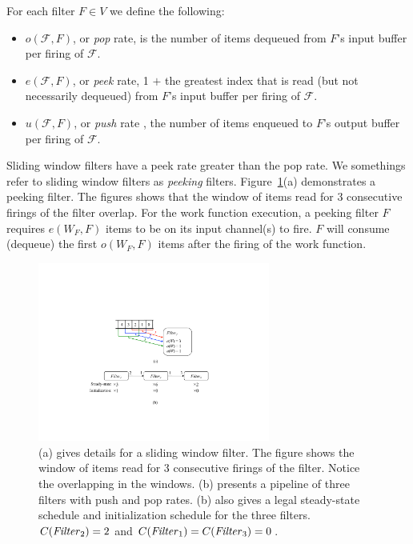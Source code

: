 For each filter $F \in V$ we define the following:
\begin{itemize}

\item $o(\mathcal{F}, F)$, or {\it pop} rate, is the number of items
  dequeued from $F$'s input buffer per firing of $\mathcal{F}$.

\item $e(\mathcal{F}, F)$, or  {\it peek} rate, 1 $+$ the greatest index that is read (but
  not necessarily dequeued) from $F$'s input buffer per firing of
  $\mathcal{F}$. 

\item $u(\mathcal{F}, F)$, or {\it push} rate , the number of items enqueued to $F$'s
output buffer per firing of $\mathcal{F}$.  

\end{itemize}

\noindent Sliding window filters have a peek rate greater than the pop
rate.  We somethings refer to sliding window filters as {\it peeking}
filters. Figure~\ref{fig:pipeline-example}(a)
demonstrates a peeking filter.  The figures shows that the window of
items read for 3 consecutive firings of the filter overlap.  For the
work function execution, a peeking filter $F$ requires $e(W_F, F)$
items to be on its input channel(s) to fire.  $F$ will consume
(dequeue) the first $o(W_F, F)$ items after the firing of the work function.

\begin{figure}[t]
\centering
\includegraphics[width=3.0in]{figures/pipeline-example.pdf}
\caption[A pipeline of three filters with schedules.]{ (a) gives
  details for a sliding window filter.  The figure
  shows the window of items read for 3 consecutive firings of the
  filter.  Notice the overlapping in the windows.  (b) presents a pipeline of
  three filters with push and pop rates.  (b) also gives a
  legal steady-state schedule and initialization schedule for the
  three filters. $C(\relax{\it Filter}_2) = 2$ and
$C(\relax{\it Filter}_1) = C(\relax{\it Filter}_3) = 0$. 
  \label{fig:pipeline-example}}
\vspace{-10pt}
\end{figure}

